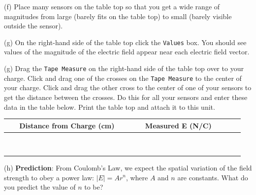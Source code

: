 (f) Place many sensors on the table top so that you get a wide range of 
magnitudes from large
(barely fits on the table top) to small (barely visible outside the sensor).

(g) On the right-hand side of the table top click the {\tt Values} box. 
You should see values of the magnitude of the electric field appear near each
electric field vector.

(g) Drag the {\tt Tape Measure} on the right-hand side of the table top over to
your charge.
Click and drag one of the crosses on the {\tt Tape Measure} to the center of your charge.
Click and drag the other cross to the center of one of your sensors to get
the distance between the crosses.
Do this for all your sensors and enter these data in the table below. 
Print the table top and attach it to this unit.

\vspace{0.3cm}
{\centering \begin{tabular}{|c|c|c|c|}
\hline 
~~~Distance from Charge (cm)~~~&
~~~Measured E (N/C)~~~\\
\hline
\hline 
&
\\
\hline 
&
\\
\hline 
&
\\
\hline 
&
\\
\hline 
&
\\
\hline 
&
\\
\hline 
&
\\
\hline 
&
\\
\hline 
&
\\
\hline
\end{tabular}\par}
\vspace{0.3cm}


\newpage

(h) \textbf{Prediction}: From Coulomb's Law, we expect the spatial variation
of the field strength to obey a power law: \( \left| E\right| =Ar^{n} \),
where \( A \) and \( n \) are constants. What do you predict the value of 
\( n \) to be?\vspace{15mm}

